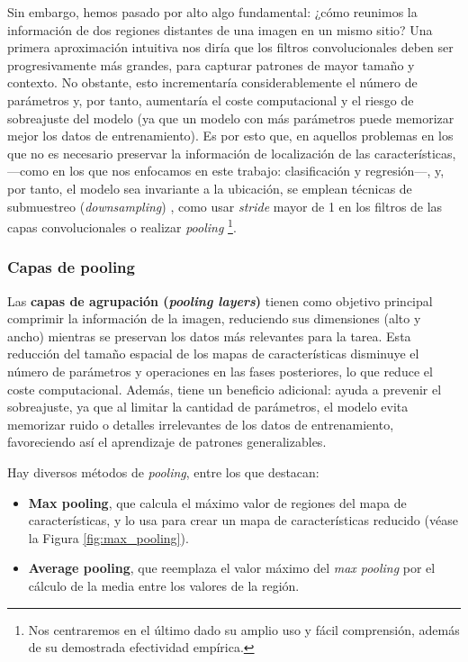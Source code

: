 Sin embargo, hemos pasado por alto algo fundamental: ¿cómo reunimos la información de dos regiones distantes 
de una imagen en un mismo sitio? Una primera aproximación intuitiva nos diría que los filtros convolucionales 
deben ser progresivamente más grandes, para capturar patrones de mayor tamaño y contexto. No obstante, esto
incrementaría considerablemente el número de parámetros y, por tanto, aumentaría el coste computacional y 
el riesgo de sobreajuste del modelo (ya que un modelo con más parámetros puede memorizar mejor los
datos de entrenamiento). Es por esto que, en aquellos problemas en los que no es necesario preservar la 
información de localización de las características, ---como en los que nos enfocamos en este trabajo: 
clasificación y regresión---, y, por tanto, el modelo sea invariante a la ubicación, se emplean técnicas de 
submuestreo (\textit{downsampling}) \cite{murphy2022}, como usar \textit{stride} mayor de 1 en los filtros
de las capas convolucionales o realizar \textit{pooling}%
\footnote{
    Nos centraremos en el último dado su amplio uso y fácil comprensión, además de su demostrada efectividad 
    empírica.
}.



\subsubsection{Capas de pooling}


Las \textbf{capas de agrupación (\textit{pooling layers})} tienen como objetivo principal comprimir la 
información de la imagen, reduciendo sus dimensiones (alto y ancho) mientras se preservan los datos más 
relevantes para la tarea. Esta reducción del tamaño espacial de los mapas de características disminuye el 
número de parámetros y operaciones en las fases posteriores, lo que reduce el coste computacional. Además, 
tiene un beneficio adicional: ayuda a prevenir el sobreajuste, ya que al limitar la cantidad de parámetros, 
el modelo evita memorizar ruido o detalles irrelevantes de los datos de entrenamiento, favoreciendo así el 
aprendizaje de patrones generalizables.

Hay diversos métodos de \textit{pooling}, entre los que destacan:

\begin{itemize}

    \item \textbf{Max pooling}, que calcula el máximo valor de regiones del mapa de características, y lo
    usa para crear un mapa de características reducido (véase la Figura \ref{fig:max_pooling}).

    \item \textbf{Average pooling}, que reemplaza el valor máximo del \textit{max pooling} por el cálculo de
    la media entre los valores de la región. 

\end{itemize}

